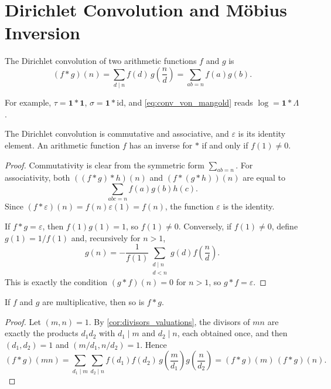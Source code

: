 \section{Dirichlet Convolution and Möbius Inversion}

\begin{definition}\label{def:dirichlet_convolution}
    The Dirichlet convolution of two arithmetic functions $f$ and $g$ is
    \begin{equation*}
        (f * g)(n) = \sum_{d \mid n} f(d)\, g\!\left(\frac{n}{d}\right) = \sum_{ab = n} f(a) g(b).
    \end{equation*}
\end{definition}
For example, $\tau = \mathbf{1} * \mathbf{1}$, $\sigma = \mathbf{1} * \mathrm{id}$, and \cref{eq:conv_von_mangold} reads $\log = \mathbf{1} * \Lambda$.

\begin{proposition}\label{prop:convolution_ring}
    The Dirichlet convolution is commutative and associative, and $\varepsilon$ is its identity element. An arithmetic function $f$ has an inverse for $*$ if and only if $f(1) \neq 0$.
\end{proposition}
\begin{proof}
    Commutativity is clear from the symmetric form $\sum_{ab = n}$. For associativity, both $((f*g)*h)(n)$ and $(f*(g*h))(n)$ are equal to
    \begin{equation*}
        \sum_{abc = n} f(a) g(b) h(c).
    \end{equation*}
    Since $(f * \varepsilon)(n) = f(n)\varepsilon(1) = f(n)$, the function $\varepsilon$ is the identity.

    If $f * g = \varepsilon$, then $f(1)g(1) = 1$, so $f(1) \neq 0$. Conversely, if $f(1) \neq 0$, define $g(1) = 1/f(1)$ and, recursively for $n > 1$,
    \begin{equation*}
        g(n) = -\frac{1}{f(1)} \sum_{\substack{d \mid n \\ d < n}} g(d) f\!\left(\frac{n}{d}\right).
    \end{equation*}
    This is exactly the condition $(g * f)(n) = 0$ for $n > 1$, so $g * f = \varepsilon$.
\end{proof}

\begin{proposition}\label{prop:convolution_multiplicative}
    If $f$ and $g$ are multiplicative, then so is $f * g$.
\end{proposition}
\begin{proof}
    Let $(m,n) = 1$. By \cref{cor:divisors_valuations}, the divisors of $mn$ are exactly the products $d_1 d_2$ with $d_1 \mid m$ and $d_2 \mid n$, each obtained once, and then $(d_1, d_2) = 1$ and $(m/d_1, n/d_2) = 1$. Hence
    \begin{equation*}
        (f*g)(mn) = \sum_{d_1 \mid m}\sum_{d_2 \mid n} f(d_1)f(d_2)\, g\!\left(\frac{m}{d_1}\right) g\!\left(\frac{n}{d_2}\right) = (f*g)(m)\,(f*g)(n).
    \end{equation*}
\end{proof}

